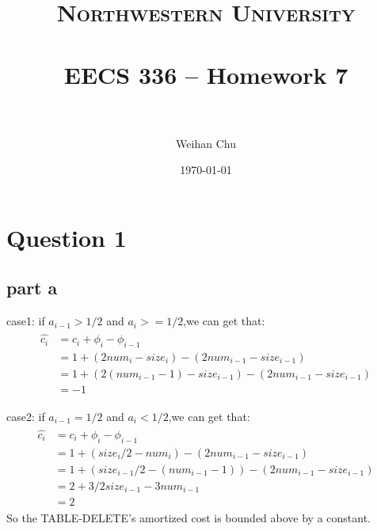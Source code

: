 \documentclass[paper=a4, fontsize=11pt]{scrartcl} %
\title{	
\normalfont \normalsize 
\textsc{Northwestern University} \\ [25pt] %
\horrule{0.5pt} \\[0.4cm] %
\huge EECS 336 -- Homework 7 \\ %
\horrule{2pt} \\[0.5cm] %
}
\author{Weihan Chu} %
\date{\normalsize\today} %
\numberwithin{equation}{section} %
\numberwithin{figure}{section} %
\numberwithin{table}{section} %
\begin{document}
\maketitle %


\section{\textbf{Question 1}}
\subsection{\textbf{part a}}
case1: if $a_{i-1}>1/2$ and $a_i>=1/2$,we can get that:\\
\begin{align*}
\begin{split}
\hat{c_i}&=c_i+\phi_i-\phi_{i-1}\\
         &=1+(2num_i-size_i)-(2num_{i-1}-size_{i-1})\\
         &=1+(2(num_{i-1}-1)-size_{i-1})-(2num_{i-1}-size_{i-1})\\
         &=-1
\end{split}
\end{align*}

case2: if $a_{i-1}=1/2$ and $a_i<1/2$,we can get that:\\
\begin{align*}
\begin{split}
\hat{c_i}&=c_i+\phi_i-\phi_{i-1}\\
         &=1+(size_i/2-num_i)-(2num_{i-1}-size_{i-1})\\
         &=1+(size_{i-1}/2-(num_{i-1}-1))-(2num_{i-1}-size_{i-1})\\
         &=2+3/2size_{i-1}-3num_{i-1}\\
         &=2
\end{split}
\end{align*}
So the TABLE-DELETE's amortized cost is bounded above by a constant.
\end{document}
